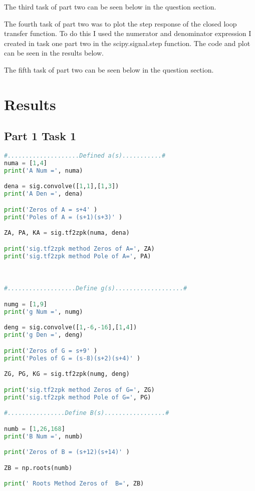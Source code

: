 \documentclass[11pt,a4]{report}
\begin{document}
The third task of part two can be seen below in the question section.

The fourth task of part two was to plot the step response of the closed loop transfer function. To do this I used the numerator and denominator expression I created in task one part two in the scipy.signal.step function. The code and plot can be seen in the results below. 

The fifth task of part two can be seen below in the question section.

\section{Results}


\subsection{Part 1 Task 1}

\begin{lstlisting}[language=Python]
#....................Defined a(s)...........#
numa = [1,4]
print('A Num =', numa)

dena = sig.convolve([1,1],[1,3])
print('A Den =', dena)

print('Zeros of A = s+4' )
print('Poles of A = (s+1)(s+3)' )

ZA, PA, KA = sig.tf2zpk(numa, dena)

print('sig.tf2zpk method Zeros of A=', ZA)
print('sig.tf2zpk method Pole of A=', PA)



#...................Define g(s)...................#

numg = [1,9]
print('g Num =', numg)

deng = sig.convolve([1,-6,-16],[1,4])
print('g Den =', deng)

print('Zeros of G = s+9' )
print('Poles of G = (s-8)(s+2)(s+4)' )

ZG, PG, KG = sig.tf2zpk(numg, deng)

print('sig.tf2zpk method Zeros of G=', ZG)
print('sig.tf2zpk method Pole of G=', PG)

#................Define B(s).................#

numb = [1,26,168]
print('B Num =', numb)

print('Zeros of B = (s+12)(s+14)' )

ZB = np.roots(numb)

print(' Roots Method Zeros of  B=', ZB)
\end{lstlisting}
\end{document}
